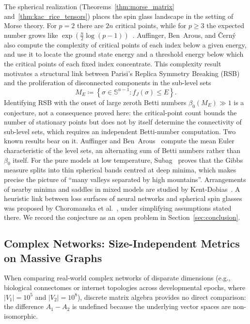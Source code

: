 \documentclass[11pt,a4paper,reqno]{amsart}
\theoremstyle{definition}
\numberwithin{equation}{section}
\newcommand{\Sph}{\mathbb{S}}
\begin{document}
The spherical realization (Theorems~\ref{thm:morse_matrix} and~\ref{thm:kac_rice_tensors}) places the spin glass landscape in the setting of Morse theory. For $p = 2$ there are $2n$ critical points, while for $p \ge 3$ the expected number grows like $\exp(\frac{n}{2}\log(p-1))$~\cite{auffinger2013random}. Auffinger, Ben~Arous, and \v{C}ern\'y also compute the complexity of critical points of each index below a given energy, and use it to locate the ground state energy and a threshold energy below which the critical points of each fixed index concentrate. This complexity result motivates a structural link between Parisi's Replica Symmetry Breaking (RSB) and the proliferation of disconnected components in the sub-level sets
\begin{equation}
    M_E \coloneqq \left\{ \sigma \in \Sph^{n-1} \colon f_J(\sigma) \le E \right\}.
\end{equation}
Identifying RSB with the onset of large zeroth Betti numbers $\beta_0(M_E) \gg 1$ is a conjecture, not a consequence proved here: the critical-point count bounds the number of stationary points but does not by itself determine the connectivity of sub-level sets, which requires an independent Betti-number computation. Two known results bear on it. Auffinger and Ben~Arous~\cite{auffinger2013complexity} compute the mean Euler characteristic of the level sets, an alternating sum of Betti numbers rather than $\beta_0$ itself. For the pure models at low temperature, Subag~\cite{subag2017geometry} proves that the Gibbs measure splits into thin spherical bands centred at deep minima, which makes precise the picture of ``many valleys separated by high mountains''. Arrangements of nearby minima and saddles in mixed models are studied by Kent-Dobias~\cite{kentdobias2024arrangement}. A heuristic link between loss surfaces of neural networks and spherical spin glasses was proposed by Choromanska et al.~\cite{choromanska2015loss}, under simplifying assumptions stated there. We record the conjecture as an open problem in Section~\ref{sec:conclusion}.

\subsection{Complex Networks: Size-Independent Metrics on Massive Graphs}
\label{subsec:imp_networks}
When comparing real-world complex networks of disparate dimensions (e.g., biological connectomes or internet topologies across developmental epochs, where $|V_1| = 10^5$ and $|V_2| = 10^8$), discrete matrix algebra provides no direct comparison: the difference $A_1 - A_2$ is undefined because the underlying vector spaces are non-isomorphic.
\end{document}
